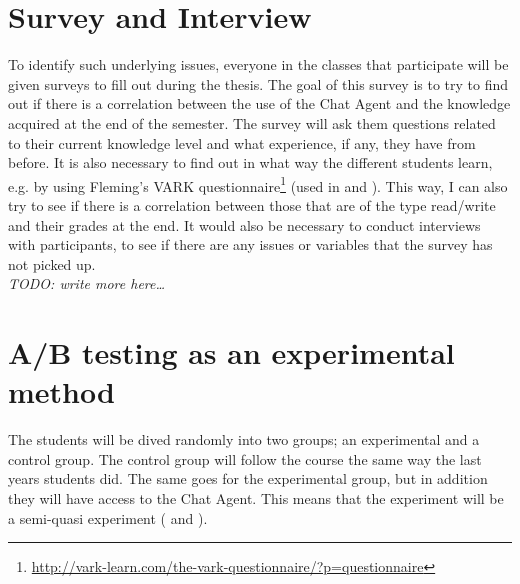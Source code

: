 \section{Survey and Interview}
\label{chapter4:survey_and_interview}
To identify such underlying issues, everyone in the classes that participate will be given surveys to fill out during the thesis. The goal of this survey is to try 
to find out if there is a correlation between the use of the Chat Agent and the knowledge acquired at the end of the semester. The survey will ask them questions 
related to their current knowledge level and what experience, if any, they have from before. It is also necessary to find out in what way the different students learn, 
e.g. by using Fleming's VARK questionnaire\footnote{\url{http://vark-learn.com/the-vark-questionnaire/?p=questionnaire}} (used in \citet[p.~152]{Kowalski2013} and 
\citet{Sarabdeen2013}). This way, 
I can also try to see if there is a correlation between those that are of the type read/write and their grades at the end.
\vspace{0.5em}\newline
It would also be necessary to conduct interviews with participants, to see if there are any issues or variables that the survey has not picked up. \\
\emph{TODO: write more here\ldots}

\section{A/B testing as an experimental method}
\label{chapter4:ab_testing_experimental}
The students will be dived randomly into two groups; an experimental and a control group. The control group will follow the course the same way the last years students 
did. The same goes for the experimental group, but in addition they will have access to the Chat Agent. This means that the experiment will be a semi-quasi experiment 
(\citet[p.~226-248]{Leedy2012} and \citet[p.~114-115]{Ringdal2007}).


